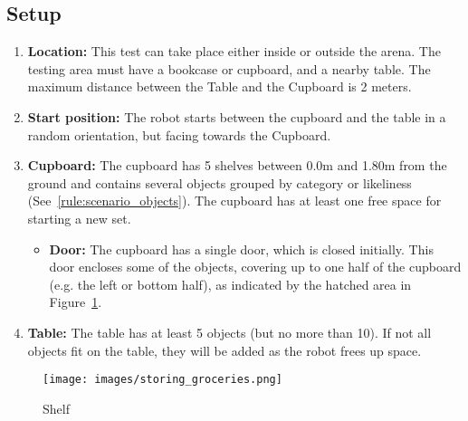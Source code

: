 %
%
\begin{minipage}{0.70\textwidth}
	\subsection{Setup}
	\begin{enumerate}
		\item \textbf{Location:} This test can take place either inside or outside the arena. The testing area must have a bookcase or cupboard, and a nearby table. The maximum distance between the Table and the Cupboard is 2 meters.
		\item \textbf{Start position:} The robot starts between the cupboard and the table in a random orientation, but facing towards the Cupboard.
		\item \textbf{Cupboard:} The cupboard has 5 shelves between 0.0m and 1.80m from the ground and contains several objects grouped by category or likeliness (See~\ref{rule:scenario_objects}). The cupboard has at least one free space for starting a new set.
		\begin{itemize}
		 	\item \textbf{Door:} The cupboard has a single door, which is closed initially.
		 	This door encloses some of the objects, covering up to one half of the cupboard (e.g. the left or bottom half), as indicated by the hatched area in Figure~\ref{fig:storing_groceries_shelf}.
		\end{itemize}
		\item \textbf{Table:} The table has at least 5 objects (but no more than 10). If not all objects fit on the table, they will be added as the robot frees up space.
	\end{enumerate}
\end{minipage}\hfill
\begin{minipage}{0.25\textwidth}
	\begin{figure}[H]
		\centering
		\texttt{[image: images/storing\_groceries.png]}%
		\vspace{-10pt}
		\caption{Shelf}
		\label{fig:storing_groceries_shelf}
	\end{figure}
\end{minipage}

%
%
